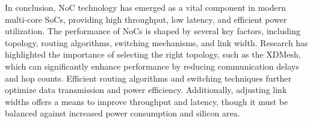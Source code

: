 

In conclusion, NoC technology has emerged as a vital component in modern multi-core SoCs, providing high throughput, low latency, and efficient power utilization.
The performance of NoCs is shaped by several key factors, including topology, routing algorithms, switching mechanisms, and link width.
Research has highlighted the importance of selecting the right topology, such as the XDMesh, which can significantly enhance performance by reducing communication delays and hop counts.
Efficient routing algorithms and switching techniques further optimize data transmission and power efficiency.
Additionally, adjusting link widths offers a means to improve throughput and latency, though it must be balanced against increased power consumption and silicon area.